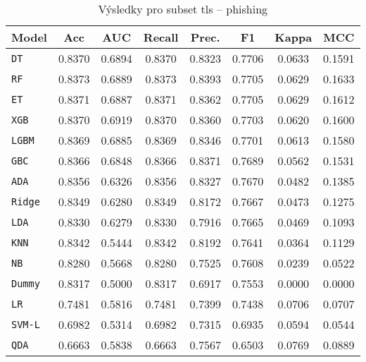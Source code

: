 \begin{table}[H]
  \centering
  \small
  \caption{Výsledky pro subset tls – phishing}
  \begin{tabular}{|l|c|c|c|c|c|c|c|}
    \hline
    \textbf{Model} & \textbf{Acc} & \textbf{AUC} & \textbf{Recall} & \textbf{Prec.} & \textbf{F1} & \textbf{Kappa} & \textbf{MCC} \\
    \hline
    \texttt{DT} & 0.8370 & 0.6894 & 0.8370 & 0.8323 & 0.7706 & 0.0633 & 0.1591 \\
    \texttt{RF} & 0.8373 & 0.6889 & 0.8373 & 0.8393 & 0.7705 & 0.0629 & 0.1633 \\
    \texttt{ET} & 0.8371 & 0.6887 & 0.8371 & 0.8362 & 0.7705 & 0.0629 & 0.1612 \\
    \texttt{XGB} & 0.8370 & 0.6919 & 0.8370 & 0.8360 & 0.7703 & 0.0620 & 0.1600 \\
    \texttt{LGBM} & 0.8369 & 0.6885 & 0.8369 & 0.8346 & 0.7701 & 0.0613 & 0.1580 \\
    \texttt{GBC} & 0.8366 & 0.6848 & 0.8366 & 0.8371 & 0.7689 & 0.0562 & 0.1531 \\
    \texttt{ADA} & 0.8356 & 0.6326 & 0.8356 & 0.8327 & 0.7670 & 0.0482 & 0.1385 \\
    \texttt{Ridge} & 0.8349 & 0.6280 & 0.8349 & 0.8172 & 0.7667 & 0.0473 & 0.1275 \\
    \texttt{LDA} & 0.8330 & 0.6279 & 0.8330 & 0.7916 & 0.7665 & 0.0469 & 0.1093 \\
    \texttt{KNN} & 0.8342 & 0.5444 & 0.8342 & 0.8192 & 0.7641 & 0.0364 & 0.1129 \\
    \texttt{NB} & 0.8280 & 0.5668 & 0.8280 & 0.7525 & 0.7608 & 0.0239 & 0.0522 \\
    \texttt{Dummy} & 0.8317 & 0.5000 & 0.8317 & 0.6917 & 0.7553 & 0.0000 & 0.0000 \\
    \texttt{LR} & 0.7481 & 0.5816 & 0.7481 & 0.7399 & 0.7438 & 0.0706 & 0.0707 \\
    \texttt{SVM-L} & 0.6982 & 0.5314 & 0.6982 & 0.7315 & 0.6935 & 0.0594 & 0.0544 \\
    \texttt{QDA} & 0.6663 & 0.5838 & 0.6663 & 0.7567 & 0.6503 & 0.0769 & 0.0889 \\
    \hline
  \end{tabular}
\end{table}
\vspace{0.5cm}

